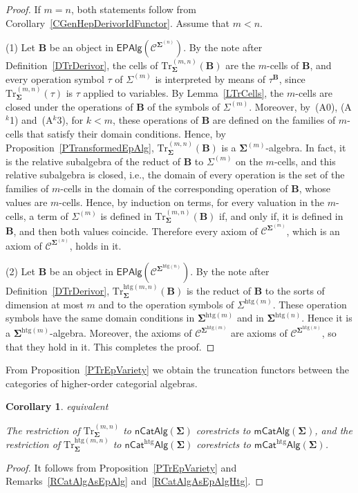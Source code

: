 \documentclass[a4paper, reqno]{amsbook}
\makeatletter
\newcommand{\sig}[1]{\mathbf{#1}}             %
\newcommand{\spec}[1]{\boldsymbol{\mathcal{#1}}} %
\newcommand{\htg}{\mathrm{htg}}                %
\newcommand{\Tr}{\mathrm{Tr}}
\theoremstyle{plain}
\newtheorem{corollary}[theorem]{Corollary}
\theoremstyle{definition}
\newcommand*{\CA@leanpending}{}
\newcommand*{\CA@leanrelation}{}
\newcommand*{\lean}[2]{%
  \ifcsname\string\color@lean@#1\endcsname\else
    \PackageError{main}{Unknown relation `#1' in \string\lean}{Use equivalent, weaker or stronger.}%
  \fi
  \gdef\CA@leanrelation{#1}%
  \gdef\CA@leanpending{#2}}
\makeatother
\begin{document}
\begin{proof}
If $m=n$, both statements follow from Corollary~\ref{CGenHepDerivorIdFunctor}.
Assume that $m<n$.

(1) Let $\mathbf{B}$ be an object in $\mathsf{EPAlg}(\spec{C}^{\sig{\Sigma}^{(n)}})$.
By the note after Definition~\ref{DTrDerivor}, the cells of $\Tr^{(m,n)}_{\sig{\Sigma}}(\mathbf{B})$ are the $m$-cells of $\mathbf{B}$, and every operation symbol $\tau$ of $\Sigma^{(m)}$ is interpreted by means of $\tau^{\mathbf{B}}$, since $\Tr^{(m,n)}_{\sig{\Sigma}}(\tau)$ is $\tau$ applied to variables.
By Lemma~\ref{LTrCells}, the $m$-cells are closed under the operations of $\mathbf{B}$ of the symbols of $\Sigma^{(m)}$.
Moreover, by~(A0), (A$^{k}$1) and~(A$^{k}$3), for $k<m$, these operations of $\mathbf{B}$ are defined on the families of $m$-cells that satisfy their domain conditions.
Hence, by Proposition~\ref{PTransformedEpAlg}, $\Tr^{(m,n)}_{\sig{\Sigma}}(\mathbf{B})$ is a $\sig{\Sigma}^{(m)}$-algebra.
In fact, it is the relative subalgebra of the reduct of $\mathbf{B}$ to $\Sigma^{(m)}$ on the $m$-cells, and this relative subalgebra is closed, i.e., the domain of every operation is the set of the families of $m$-cells in the domain of the corresponding operation of $\mathbf{B}$, whose values are $m$-cells.
Hence, by induction on terms, for every valuation in the $m$-cells, a term of $\Sigma^{(m)}$ is defined in $\Tr^{(m,n)}_{\sig{\Sigma}}(\mathbf{B})$ if, and only if, it is defined in $\mathbf{B}$, and then both values coincide.
Therefore every axiom of $\spec{C}^{\sig{\Sigma}^{(m)}}$, which is an axiom of $\spec{C}^{\sig{\Sigma}^{(n)}}$, holds in it.

(2) Let $\mathbf{B}$ be an object in $\mathsf{EPAlg}(\spec{C}^{\sig{\Sigma}^{\htg(n)}})$.
By the note after Definition~\ref{DTrDerivor}, $\Tr^{\htg(m,n)}_{\sig{\Sigma}}(\mathbf{B})$ is the reduct of $\mathbf{B}$ to the sorts of dimension at most $m$ and to the operation symbols of $\Sigma^{\htg(m)}$.
These operation symbols have the same domain conditions in $\sig{\Sigma}^{\htg(m)}$ and in $\sig{\Sigma}^{\htg(n)}$.
Hence it is a $\sig{\Sigma}^{\htg(m)}$-algebra.
Moreover, the axioms of $\spec{C}^{\sig{\Sigma}^{\htg(m)}}$ are axioms of $\spec{C}^{\sig{\Sigma}^{\htg(n)}}$, so that they hold in it. This completes the proof.
\end{proof}

From Proposition~\ref{PTrEpVariety} we obtain the truncation functors between the categories of higher-order categorial algebras.

\begin{corollary}\label{CTrFunctor}\lean{equivalent}{Dimensions.homogeneousTruncationFunctor,Dimensions.heterogeneousTruncationFunctor}
The restriction of $\Tr^{(m,n)}_{\sig{\Sigma}}$ to $\mathsf{nCatAlg}(\sig{\Sigma})$ corestricts to $\mathsf{mCatAlg}(\sig{\Sigma})$, and the restriction of $\Tr^{\htg(m,n)}_{\sig{\Sigma}}$ to $\mathsf{nCat}^{\htg}\mathsf{Alg}(\sig{\Sigma})$ corestricts to $\mathsf{mCat}^{\htg}\mathsf{Alg}(\sig{\Sigma})$.
\end{corollary}
\begin{proof}
It follows from Proposition~\ref{PTrEpVariety} and Remarks~\ref{RCatAlgAsEpAlg} and~\ref{RCatAlgAsEpAlgHtg}.
\end{proof}
\end{document}
